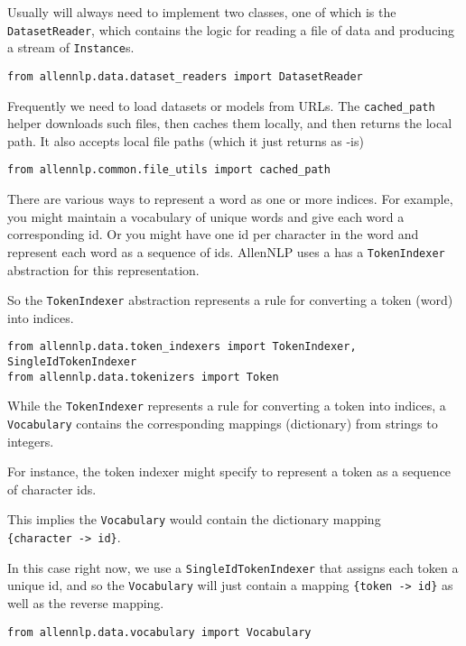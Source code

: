 \documentclass[
]{article}
\begin{document}
Usually will always need to implement two classes, one of which is the
\texttt{DatasetReader}, which contains the logic for reading a file of
data and producing a stream of \texttt{Instance}s.

\begin{verbatim}
from allennlp.data.dataset_readers import DatasetReader
\end{verbatim}

Frequently we need to load datasets or models from URLs. The
\texttt{cached\_path} helper downloads such files, then caches them
locally, and then returns the local path. It also accepts local file
paths (which it just returns as -is)

\begin{verbatim}
from allennlp.common.file_utils import cached_path
\end{verbatim}

There are various ways to represent a word as one or more indices. For
example, you might maintain a vocabulary of unique words and give each
word a corresponding id. Or you might have one id per character in the
word and represent each word as a sequence of ids. AllenNLP uses a has a
\texttt{TokenIndexer} abstraction for this representation.

So the \texttt{TokenIndexer} abstraction represents a rule for
converting a token (word) into indices.

\begin{verbatim}
from allennlp.data.token_indexers import TokenIndexer, SingleIdTokenIndexer
from allennlp.data.tokenizers import Token
\end{verbatim}

While the \texttt{TokenIndexer} represents a rule for converting a token
into indices, a \texttt{Vocabulary} contains the corresponding mappings
(dictionary) from strings to integers.

For instance, the token indexer might specify to represent a token as a
sequence of character ids.

This implies the \texttt{Vocabulary} would contain the dictionary
mapping \texttt{\{character\ -\textgreater{}\ id\}}.

In this case right now, we use a \texttt{SingleIdTokenIndexer} that
assigns each token a unique id, and so the \texttt{Vocabulary} will just
contain a mapping \texttt{\{token\ -\textgreater{}\ id\}} as well as the
reverse mapping.

\begin{verbatim}
from allennlp.data.vocabulary import Vocabulary
\end{verbatim}
\end{document}
